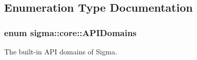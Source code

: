 \subsection{Enumeration Type Documentation}
\hypertarget{namespacesigma_1_1core_a48ec553a4adec5e4ca04a94946e39227}{}
\subsubsection[{A\+P\+I\+Domains}]{\setlength{\rightskip}{0pt plus 5cm}enum {\bf sigma\+::core\+::\+A\+P\+I\+Domains}}\label{namespacesigma_1_1core_a48ec553a4adec5e4ca04a94946e39227}


The built-\/in A\+P\+I domains of Sigma. 

